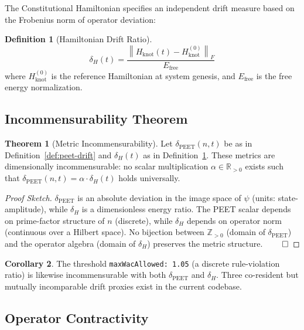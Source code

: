\documentclass[11pt,letterpaper]{article}
\theoremstyle{definition}
\newtheorem{definition}{Definition}[section]
\newtheorem{theorem}{Theorem}[section]
\newtheorem{corollary}[theorem]{Corollary}
\theoremstyle{remark}
\newcommand{\peet}{\mathrm{PEET}}
\newcommand{\norm}[1]{\left\|#1\right\|_F}
\begin{document}
The Constitutional Hamiltonian specifies an independent drift measure
based on the Frobenius norm of operator deviation:

\begin{definition}[Hamiltonian Drift Ratio]
\label{def:ham-drift}
\begin{equation}
  \delta_H(t) = \frac{\norm{H_{\text{knot}}(t) - H_{\text{knot}}^{(0)}}}{E_{\text{free}}}
  \label{eq:ham-drift}
\end{equation}
where \(H_{\text{knot}}^{(0)}\) is the reference Hamiltonian at
system genesis, and \(E_{\text{free}}\) is the free energy normalization.
\end{definition}

\subsection{Incommensurability Theorem}

\begin{theorem}[Metric Incommensurability]
\label{thm:incommensurable}
Let \(\delta_{\peet}(n,t)\) be as in Definition~\ref{def:peet-drift}
and \(\delta_H(t)\) as in Definition~\ref{def:ham-drift}. These
metrics are dimensionally incommensurable: no scalar multiplication
\(\alpha \in \mathbb{R}_{>0}\) exists such that
\(\delta_{\peet}(n,t) = \alpha \cdot \delta_H(t)\) holds universally.
\end{theorem}

\begin{proof}[Proof Sketch]
\(\delta_{\peet}\) is an absolute deviation in the image space of
\(\psi\) (units: state-amplitude), while \(\delta_H\) is a
dimensionless energy ratio. The PEET scalar depends on prime-factor
structure of \(n\) (discrete), while \(\delta_H\) depends on
operator norm (continuous over a Hilbert space). No bijection
between \(\mathbb{Z}_{>0}\) (domain of \(\delta_{\peet}\)) and
the operator algebra (domain of \(\delta_H\)) preserves the
metric structure. \(\qed\)
\end{proof}

\begin{corollary}
The threshold \texttt{maxWacAllowed: 1.05} (a discrete rule-violation
ratio) is likewise incommensurable with both \(\delta_{\peet}\)
and \(\delta_H\). Three co-resident but mutually incomparable
drift proxies exist in the current codebase.
\end{corollary}

\subsection{Operator Contractivity}
\end{document}
